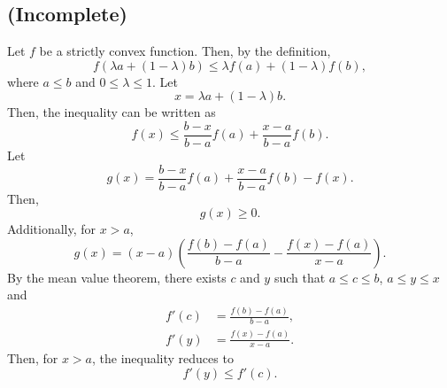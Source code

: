 \subsection{(Incomplete)}
\label{1.36}
Let $f$ be a strictly convex function.
Then, by the definition,
%
\begin{equation}
f 
\left( 
	\lambda 
	a 
	+ 
	(1 - \lambda) 
	b 
\right) 
\leq 
\lambda 
f(a)
+ 
(1 - \lambda) 
f(b),
\end{equation}
%
where $a \leq b$ and $0 \leq \lambda \leq 1$.
Let
%
\begin{equation}
x 
= 
\lambda 
a 
+ 
(1 - \lambda) 
b.
\end{equation}
%
Then, the inequality can be written as
%
\begin{equation}
f(x) 
\leq 
\frac{b - x}{b - a} 
f(a) 
+ 
\frac{x - a}{b - a} 
f(b).
\end{equation}
%
Let 
%
\begin{equation}
g(x) 
= 
\frac{b - x}{b - a} 
f(a) 
+ 
\frac{x - a}{b - a} 
f(b)
- 
f(x).
\end{equation}
%
Then,
%
\begin{equation}
g(x) 
\geq 
0.
\end{equation}
%
Additionally, for $x > a$,
%
\begin{equation}
g(x) 
= 
(x - a) 
\left( 
	\frac{f(b) - f(a)}{b - a} 
	- 
	\frac{f(x) - f(a)}{x - a} 
\right).
\end{equation}
%
By the mean value theorem, there exists $c$ and $y$ such that $a \leq c \leq b$, $a \leq y \leq x$ and
%
\begin{equation}
\begin{aligned}
f'(c) 
&= 
\frac{f(b) - f(a)}{b - a}, 
\\
f'(y) 
&= 
\frac{f(x) - f(a)}{x - a}.
\end{aligned}
\end{equation}
%
Then, for $x > a$, the inequality reduces to
%
\begin{equation}
f'(y) 
\leq 
f'(c). 
\end{equation}
%



